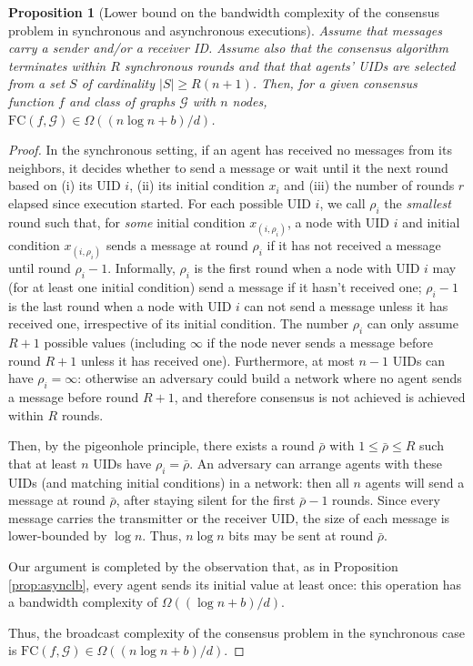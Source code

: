 \documentclass[letterpaper,10pt,conference]{ieeeconf}
\newtheorem{proposition}[theorem]{Proposition}
\begin{document}
 \begin{proposition}[Lower bound on the bandwidth complexity of the consensus problem in synchronous and asynchronous executions]
\label{prop:synclb}
Assume that messages carry a sender and/or a receiver ID. Assume also that the consensus algorithm terminates within $R$ synchronous rounds and that  that agents' UIDs are selected from a set $S$ of cardinality $|S|\geq R (n+1)$.  Then, for a given consensus function $f$ and class of graphs $\mathcal G$ with $n$ nodes,  $\textrm{FC}(f, \mathcal G) \in \Omega((n\log n+b) /d)$.
\end{proposition}
\begin{proof}
In the synchronous setting, if an agent has received no messages from its neighbors, it decides whether to send a message or wait until it the next round based on (i) its UID $i$, (ii) its initial condition $x_i$ and (iii) the number of rounds $r$ elapsed since execution started. For each possible UID $i$, we call $\rho_i$ the \emph{smallest} round such that, for \emph{some} initial condition $x_{(i,\rho_i)}$, a node with UID $i$ and initial condition $x_{(i,\rho_i)}$ sends a message at round $\rho_i$ if it has not received a message until round $\rho_i-1$. Informally, $\rho_i$ is the first round when a node with UID $i$ may (for at least one initial condition) send a message if it hasn't received one; $\rho_i-1$ is the last round when a node with UID $i$ can not send a message unless it has received one, irrespective of its initial condition.
The number $\rho_i$ can only assume $R+1$ possible values (including $\infty$ if the node never sends a message before round $R+1$ unless it has received one). Furthermore, at most $n-1$ UIDs can have $\rho_i=\infty$: otherwise an adversary could build a network where no agent sends a message before round $R+1$, and therefore consensus is not achieved is achieved within $R$ rounds.

Then, by the pigeonhole principle, there exists a round $\bar \rho$ with $1\leq \bar\rho \leq R$ such that at least $n$ UIDs have $\rho_i=\bar \rho$. An adversary can arrange agents with these UIDs (and matching initial conditions) in a network: then all $n$ agents will send a message at round $\bar \rho$, after staying silent for the first $\bar \rho -1$ rounds. Since every message carries the transmitter or the receiver UID, the size of each message is lower-bounded by $\log n$. Thus,  $n\log n$ bits may be sent at round $\bar\rho$.

Our argument is completed by the observation that, as in Proposition \ref{prop:asynclb}, every agent sends its initial value at least once: this operation has a bandwidth complexity of $\Omega((\log n + b)/d)$.

Thus, the broadcast complexity of the consensus problem in the synchronous case is $\textrm{FC}(f, \mathcal G) \in \Omega((n\log n +b)/d)$.
\end{proof}
\end{document}
